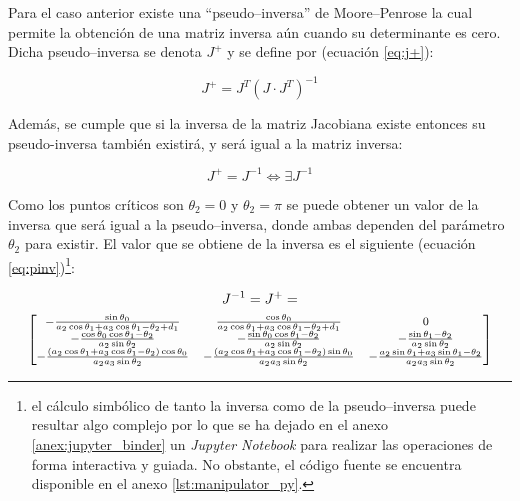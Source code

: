 Para el caso anterior existe una ``pseudo--inversa'' de Moore--Penrose \cite{PseudoinversaMoorePenrose2020}
la cual permite la obtención de una matriz inversa aún cuando su determinante es cero.
Dicha pseudo--inversa se denota $J^+$ y se define por (ecuación \ref{eq:j+}):

\begin{equation}\label{eq:j+}
    J^+ = J^T (J \cdot J^T)^{-1}
\end{equation}

Además, se cumple que si la inversa de la matriz Jacobiana existe entonces su pseudo-inversa
también existirá, y será igual a la matriz inversa:

\begin{equation*}
    J^+ = J^{-1} \iff \exists J^{-1}
\end{equation*}

Como los puntos críticos son $\theta_2 = 0$ y $\theta_2 = \pi$ se puede obtener un valor
de la inversa que será igual a la pseudo--inversa, donde ambas dependen del parámetro
$\theta_2$ para existir. El valor que se obtiene de la inversa es el siguiente (ecuación
\ref{eq:pinv})\footnote{el cálculo simbólico de tanto la inversa como de la pseudo--inversa
puede resultar algo complejo por lo que se ha dejado en el anexo \ref{anex:jupyter_binder}
un \textit{Jupyter Notebook} para realizar las operaciones de forma interactiva y guiada.
No obstante, el código fuente se encuentra disponible en el anexo \ref{lst:manipulator_py}.}:

\begin{gather}\label{eq:pinv}
    J^{-1} = J^+ = \\
    {\footnotesize\begin{bmatrix}
        - \frac{\sin{\theta_{0}}}{a_{2} \cos{\theta_{1}} + a_{3} \cos{\theta_{1} - \theta_{2}} + d_{1}}                                                 & \frac{\cos{\theta_{0}}}{a_{2} \cos{\theta_{1}} + a_{3} \cos{\theta_{1} - \theta_{2}} + d_{1}}                                                   & 0                                                                                                                                             \\
        - \frac{\cos{\theta_{0}} \cos{\theta_{1} - \theta_{2}}}{a_{2} \sin{\theta_{2}}}                                                                 & - \frac{\sin{\theta_{0}} \cos{\theta_{1} - \theta_{2}}}{a_{2} \sin{\theta_{2}}}                                                                 & - \frac{\sin{\theta_{1} - \theta_{2}}}{a_{2} \sin{\theta_{2}}}                                                    \\
        - \frac{\left(a_{2} \cos{\theta_{1}} + a_{3} \cos{\theta_{1} - \theta_{2}}\right) \cos{\theta_{0}}}{a_{2} a_{3} \sin{\theta_{2}}} & - \frac{\left(a_{2} \cos{\theta_{1}} + a_{3} \cos{\theta_{1} - \theta_{2}}\right) \sin{\theta_{0}}}{a_{2} a_{3} \sin{\theta_{2}}} & - \frac{a_{2} \sin{\theta_{1}} + a_{3} \sin{\theta_{1} - \theta_{2}}}{a_{2} a_{3} \sin{\theta_{2}}} \\
    \end{bmatrix}} \nonumber
\end{gather}